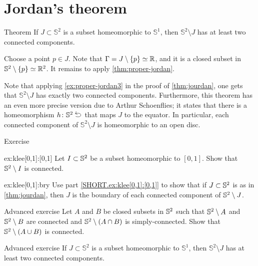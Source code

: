 \section{Jordan's theorem}

\begin{thm}{Theorem}\label{thm:jourdan}
If $J\subset\mathbb{S}^2$ is a subset homeomorphic to $\mathbb{S}^1$,
then $\mathbb{S}^2\setminus J$ has at least two connected components.
\end{thm}


Choose a point $p\in J$.
Note that $\Gamma=J\setminus\{p\}\simeq\mathbb{R}$, and it is a closed subset in $\mathbb{S}^2\setminus\{p\}\simeq\mathbb{R}^2$.
It remains to apply \ref{thm:proper-jordan}.
\qeds

Note that applying \ref{ex:proper-jordan3} in the proof of \ref{thm:jourdan}, one gets that
$\mathbb{S}^2\setminus J$ has exactly two connected components.
Furthermore, this theorem has an even more precise version due to Arthur Schoenflies;
it states that there is a homeomorphism $h\:\SS^2\selfup$ that maps $J$ to the equator.
In particular, each connected component of $\mathbb{S}^2\setminus J$ is homeomorphic to an open disc.

\begin{thm}{Exercise}\label{ex:klee[0,1]}

\begin{subthm}{ex:klee[0,1]:[0,1]}
Let $I\subset \mathbb{S}^2$ be a subset homeomorphic to $[0,1]$.
Show that $\mathbb{S}^2\setminus I$ is connected.
\end{subthm}

\begin{subthm}{ex:klee[0,1]:bry}
Use part \ref{SHORT.ex:klee[0,1]:[0,1]} to show that if $J\subset \mathbb{S}^2$ is as in \ref{thm:jourdan}, then $J$ is the boundary of each connected component of $\mathbb{S}^2\setminus J$.
\end{subthm}
\end{thm}

\begin{thm}{Advanced exercise}\label{ex:AnB}
Let $A$ and $B$ be closed subsets in $\mathbb{S}^2$ such that $\mathbb{S}^2\setminus A$ and $\mathbb{S}^2\setminus B$ are connected and $\mathbb{S}^2\setminus (A\cap B)$ is simply-connected.
Show that $\mathbb{S}^2\setminus(A\cup B)$ is connected.
\end{thm}


\begin{thm}{Advanced exercise}\label{ex:jourdan-3d}
If $J\subset\mathbb{S}^2$ is a subset homeomorphic to $\mathbb{S}^1$,
then $\mathbb{S}^2\setminus J$ has at least two connected components.
\end{thm}


